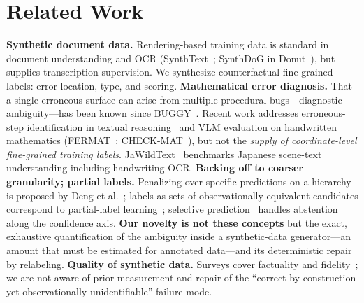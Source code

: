 \documentclass[11pt]{article}
\begin{document}
\section{Related Work}\label{sec:related}
\textbf{Synthetic document data.} Rendering-based training data is standard in document understanding and OCR (SynthText~\cite{gupta2016}; SynthDoG in Donut~\cite{kim2022}), but supplies transcription supervision. We synthesize counterfactual fine-grained labels: error location, type, and scoring.
\textbf{Mathematical error diagnosis.} That a single erroneous surface can arise from multiple procedural bugs---diagnostic ambiguity---has been known since BUGGY~\cite{brown1978}. Recent work addresses erroneous-step identification in textual reasoning~\cite{zheng2025,daheim2024} and VLM evaluation on handwritten mathematics (FERMAT~\cite{nath2025}; CHECK-MAT~\cite{khrulev2025}), but not the \emph{supply of coordinate-level fine-grained training labels}. JaWildText~\cite{maeda2026} benchmarks Japanese scene-text understanding including handwriting OCR.
\textbf{Backing off to coarser granularity; partial labels.} Penalizing over-specific predictions on a hierarchy is proposed by Deng et al.~\cite{deng2012}; labels as sets of observationally equivalent candidates correspond to partial-label learning~\cite{cour2011}; selective prediction~\cite{chow1970,geifman2017} handles abstention along the confidence axis. \textbf{Our novelty is not these concepts} but the exact, exhaustive quantification of the ambiguity inside a synthetic-data generator---an amount that must be estimated for annotated data---and its deterministic repair by relabeling.
\textbf{Quality of synthetic data.} Surveys cover factuality and fidelity~\cite{liu2024}; we are not aware of prior measurement and repair of the ``correct by construction yet observationally unidentifiable'' failure mode.
\end{document}
